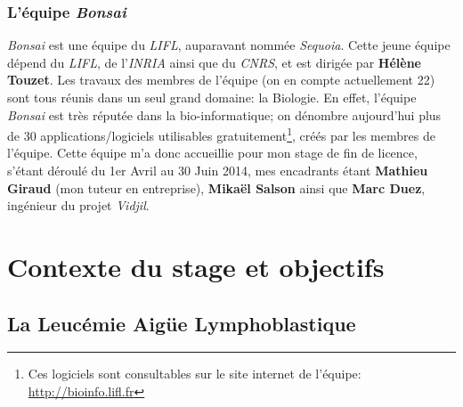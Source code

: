 \documentclass[pdftex,12pt,a4paper]{report}
\begin{document}
\begin{spacing}{1.2}
\subsection{L'équipe \textit{Bonsai}}
\textit{Bonsai} est une équipe du \textit{LIFL}, auparavant nommée \textit{Sequoia}.
Cette jeune équipe dépend du \textit{LIFL}, de l'\textit{INRIA} ainsi que du \textit{CNRS}, et est dirigée par \textbf{Hélène Touzet}.
\newline
Les travaux des membres de l'équipe (on en compte actuellement 22) sont tous réunis dans un seul grand domaine: la Biologie.
En effet, l'équipe \textit{Bonsai} est très réputée dans la bio-informatique; on dénombre aujourd'hui plus de 30 applications/logiciels utilisables gratuitement\footnote{Ces logiciels sont consultables sur le site internet de l'équipe: \url{http://bioinfo.lifl.fr}}, créés par les membres de l'équipe.
\newline
Cette équipe m'a donc accueillie pour mon stage de fin de licence, s'étant déroulé du 1er Avril au 30 Juin 2014, mes encadrants étant \textbf{Mathieu Giraud} (mon tuteur en entreprise), \textbf{Mikaël Salson} ainsi que \textbf{Marc Duez}, ingénieur du projet \textit{Vidjil}.


\chapter{Contexte du stage et objectifs}

\section{La Leucémie Aigüe Lymphoblastique}


\end{spacing}
\end{document}
